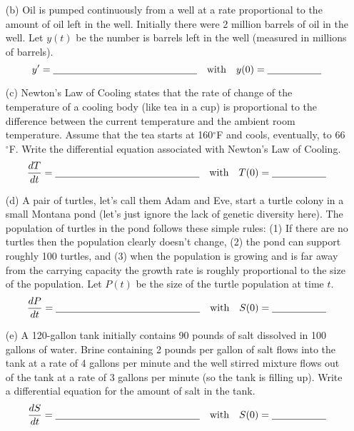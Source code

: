 \begin{problem}
\begin{enumerate}
    \item[(b)] Oil is pumped continuously from a well at a rate proportional to the amount
    of oil left in the well.  Initially there were 2 million barrels of oil in the well.
    Let $y(t)$ be the number is barrels left in the well (measured in millions of
    barrels).
    \vspace{0.1in} 
    \[ y' = \underline{\hspace{2in}} \quad \text{with} \quad y(0) =
        \underline{\hspace{0.75in}} \]
    \item[(c)] Newton's Law of Cooling states that the rate of change of the temperature
        of a cooling body (like tea in a cup) is proportional to the difference
        between the current temperature and the ambient room temperature.  Assume that the
        tea starts at 160$^\circ$F and cools, eventually, to 66$^\circ$F.  Write the
        differential equation associated with Newton's Law of Cooling.
        \[ \frac{dT}{dt} = \underline{\hspace{2in}} \quad \text{with} \quad T(0) =
            \underline{\hspace{0.75in}} \]
        \solution{
            \[ \frac{dT}{dt} = -k(T-66) \quad \text{with} \quad
                T(0) = 160 \]
        }
    \item[(d)] A pair of turtles, let's call them Adam and Eve, start a turtle colony in a
    small Montana pond (let's just ignore the lack of genetic diversity here).  The
    population of turtles in the pond follows these simple rules:  (1) If there
    are no turtles then the population clearly doesn't change, (2) the pond can support
    roughly 100 turtles, and (3) when the population is growing and is far away from the
    carrying capacity the growth rate is roughly proportional to the size of the
    population.  Let $P(t)$ be the size of the turtle population at time $t$.
    \[ \frac{dP}{dt} = \underline{\hspace{2in}} \quad \text{with} \quad S(0) =
        \underline{\hspace{0.75in}} \]
        \solution{
            \[ \frac{dP}{dt} = -kP\left( 1-\frac{P}{100} \right) \quad \text{with} \quad
                P(0) = 2 \]
        }

    \item[(e)] A 120-gallon tank initially contains 90 pounds of salt dissolved in 100
    gallons of water. Brine containing 2 pounds per gallon of salt flows into the tank at
    a rate of 4 gallons per minute and the well stirred mixture flows out of the tank at a
    rate of 3 gallons per minute (so the tank is filling up). Write a differential
    equation for the amount of salt in the tank.
    \[ \frac{dS}{dt} = \underline{\hspace{2in}} \quad \text{with} \quad S(0) =
        \underline{\hspace{0.75in}} \]
        \solution{
            \[ \frac{dS}{dt} = 8  -\frac{3S}{100+t} \quad \text{with} \quad y(0) = 10 \]
        }
\end{enumerate}
\end{problem}


